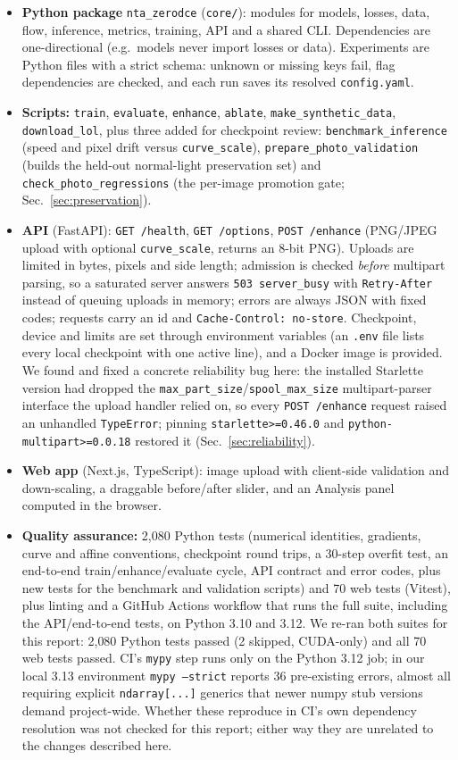 \documentclass{article}
\newcommand{\code}[1]{\texttt{#1}}
\begin{document}
\begin{itemize}[nosep]
  \item \textbf{Python package} \code{nta\_zerodce} (\code{core/}): modules for models, losses, data, flow, inference, metrics, training, API and a shared CLI. Dependencies are one-directional (e.g.\ models never import losses or data). Experiments are Python files with a strict schema: unknown or missing keys fail, flag dependencies are checked, and each run saves its resolved \code{config.yaml}.
  \item \textbf{Scripts:} \code{train}, \code{evaluate}, \code{enhance}, \code{ablate}, \code{make\_synthetic\_data}, \code{download\_lol}, plus three added for checkpoint review: \code{benchmark\_inference} (speed and pixel drift versus \code{curve\_scale}), \code{prepare\_photo\_validation} (builds the held-out normal-light preservation set) and \code{check\_photo\_regressions} (the per-image promotion gate; Sec.~\ref{sec:preservation}).
  \item \textbf{API} (FastAPI): \code{GET /health}, \code{GET /options}, \code{POST /enhance} (PNG/JPEG upload with optional \code{curve\_scale}, returns an 8-bit PNG). Uploads are limited in bytes, pixels and side length; admission is checked \emph{before} multipart parsing, so a saturated server answers \code{503 server\_busy} with \code{Retry-After} instead of queuing uploads in memory; errors are always JSON with fixed codes; requests carry an id and \code{Cache-Control: no-store}. Checkpoint, device and limits are set through environment variables (an \code{.env} file lists every local checkpoint with one active line), and a Docker image is provided. We found and fixed a concrete reliability bug here: the installed Starlette version had dropped the \code{max\_part\_size}/\code{spool\_max\_size} multipart-parser interface the upload handler relied on, so every \code{POST /enhance} request raised an unhandled \code{TypeError}; pinning \code{starlette>=0.46.0} and \code{python-multipart>=0.0.18} restored it (Sec.~\ref{sec:reliability}).
  \item \textbf{Web app} (Next.js, TypeScript): image upload with client-side validation and down-scaling, a draggable before/after slider, and an Analysis panel computed in the browser.
  \item \textbf{Quality assurance:} 2{,}080 Python tests (numerical identities, gradients, curve and affine conventions, checkpoint round trips, a 30-step overfit test, an end-to-end train/enhance/evaluate cycle, API contract and error codes, plus new tests for the benchmark and validation scripts) and 70 web tests (Vitest), plus linting and a GitHub Actions workflow that runs the full suite, including the API/end-to-end tests, on Python 3.10 and 3.12. We re-ran both suites for this report: 2{,}080 Python tests passed (2 skipped, CUDA-only) and all 70 web tests passed. CI's \code{mypy} step runs only on the Python 3.12 job; in our local 3.13 environment \code{mypy --strict} reports 36 pre-existing errors, almost all requiring explicit \code{ndarray[...]} generics that newer numpy stub versions demand project-wide. Whether these reproduce in CI's own dependency resolution was not checked for this report; either way they are unrelated to the changes described here.

\end{itemize}
\end{document}
